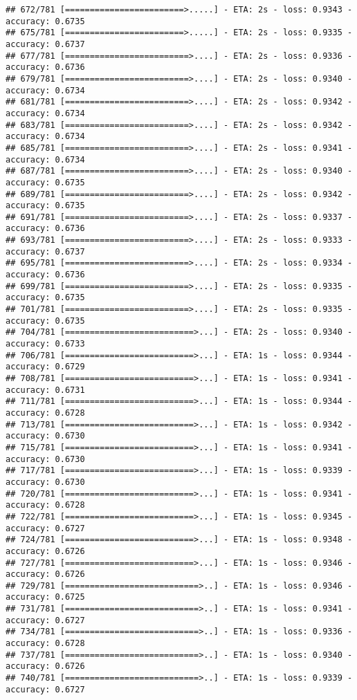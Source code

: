 \documentclass[
]{article}
\begin{document}
\begin{verbatim}
## 672/781 [========================>.....] - ETA: 2s - loss: 0.9343 - accuracy: 0.6735
## 675/781 [========================>.....] - ETA: 2s - loss: 0.9335 - accuracy: 0.6737
## 677/781 [=========================>....] - ETA: 2s - loss: 0.9336 - accuracy: 0.6736
## 679/781 [=========================>....] - ETA: 2s - loss: 0.9340 - accuracy: 0.6734
## 681/781 [=========================>....] - ETA: 2s - loss: 0.9342 - accuracy: 0.6734
## 683/781 [=========================>....] - ETA: 2s - loss: 0.9342 - accuracy: 0.6734
## 685/781 [=========================>....] - ETA: 2s - loss: 0.9341 - accuracy: 0.6734
## 687/781 [=========================>....] - ETA: 2s - loss: 0.9340 - accuracy: 0.6735
## 689/781 [=========================>....] - ETA: 2s - loss: 0.9342 - accuracy: 0.6735
## 691/781 [=========================>....] - ETA: 2s - loss: 0.9337 - accuracy: 0.6736
## 693/781 [=========================>....] - ETA: 2s - loss: 0.9333 - accuracy: 0.6737
## 695/781 [=========================>....] - ETA: 2s - loss: 0.9334 - accuracy: 0.6736
## 699/781 [=========================>....] - ETA: 2s - loss: 0.9335 - accuracy: 0.6735
## 701/781 [=========================>....] - ETA: 2s - loss: 0.9335 - accuracy: 0.6735
## 704/781 [==========================>...] - ETA: 2s - loss: 0.9340 - accuracy: 0.6733
## 706/781 [==========================>...] - ETA: 1s - loss: 0.9344 - accuracy: 0.6729
## 708/781 [==========================>...] - ETA: 1s - loss: 0.9341 - accuracy: 0.6731
## 711/781 [==========================>...] - ETA: 1s - loss: 0.9344 - accuracy: 0.6728
## 713/781 [==========================>...] - ETA: 1s - loss: 0.9342 - accuracy: 0.6730
## 715/781 [==========================>...] - ETA: 1s - loss: 0.9341 - accuracy: 0.6730
## 717/781 [==========================>...] - ETA: 1s - loss: 0.9339 - accuracy: 0.6730
## 720/781 [==========================>...] - ETA: 1s - loss: 0.9341 - accuracy: 0.6728
## 722/781 [==========================>...] - ETA: 1s - loss: 0.9345 - accuracy: 0.6727
## 724/781 [==========================>...] - ETA: 1s - loss: 0.9348 - accuracy: 0.6726
## 727/781 [==========================>...] - ETA: 1s - loss: 0.9346 - accuracy: 0.6726
## 729/781 [===========================>..] - ETA: 1s - loss: 0.9346 - accuracy: 0.6725
## 731/781 [===========================>..] - ETA: 1s - loss: 0.9341 - accuracy: 0.6727
## 734/781 [===========================>..] - ETA: 1s - loss: 0.9336 - accuracy: 0.6728
## 737/781 [===========================>..] - ETA: 1s - loss: 0.9340 - accuracy: 0.6726
## 740/781 [===========================>..] - ETA: 1s - loss: 0.9339 - accuracy: 0.6727

\end{verbatim}
\end{document}
